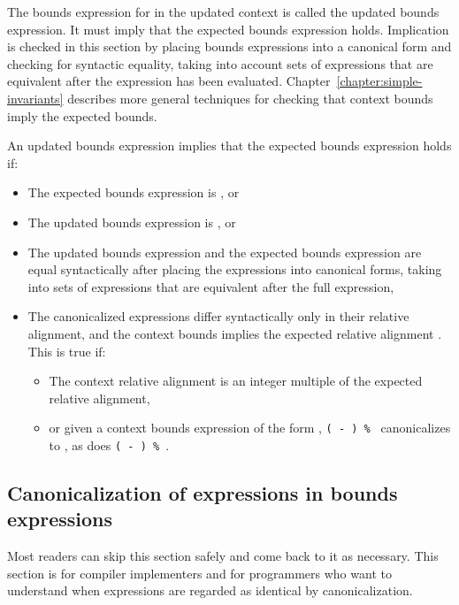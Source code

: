 The bounds expression for  in the updated context
is called the updated bounds expression.  It must imply that the
expected bounds expression holds. Implication is checked in this section
by placing bounds expressions into a canonical form and
checking for syntactic equality, taking into account sets 
of expressions that are equivalent after the expression has
been evaluated.  Chapter~\ref{chapter:simple-invariants}
describes more general techniques for checking
that context bounds imply the expected bounds.

An updated bounds expression implies that the expected bounds
expression holds if:

\begin{itemize}
\item
  The expected bounds expression is \boundsunknown, or
\item
  The updated bounds expression is \boundsany, or
\item
  The updated bounds expression and the expected bounds expression are
  equal syntactically after placing the expressions into canonical
  forms, taking into sets of expressions that are equivalent after the full
  expression,
\item
  The canonicalized expressions
  differ syntactically only in their relative alignment, and
  the context bounds implies the expected relative alignment .
  This is true if:

  \begin{itemize}
  \item
    The context relative alignment is an integer multiple of the
    expected relative alignment,
  \item
   or given a context bounds expression of the form
   ,
   \texttt{( - ) \% }
   canonicalizes to , as does
   \texttt{( - ) \% }.
  \end{itemize}
\end{itemize}


\subsection{Canonicalization of expressions in bounds expressions}
\label{section:canonicalization}

Most readers can skip this section safely and come back to it as
necessary. This section is for compiler implementers and for programmers
who want to understand when expressions are regarded as identical by
canonicalization.

